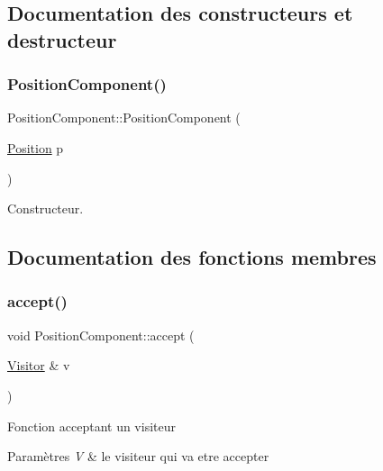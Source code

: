 \subsection{Documentation des constructeurs et destructeur}
\mbox{\label{structPositionComponent_af8c7fde08522e4ad2c911a9759ce1808}} 
\subsubsection{\texorpdfstring{Position\+Component()}{PositionComponent()}}
{\footnotesize\ttfamily Position\+Component\+::\+Position\+Component (\begin{DoxyParamCaption}\item[{\hyperlink{structPosition}{Position}}]{p }\end{DoxyParamCaption})\hspace{0.3cm}{\ttfamily [inline]}}



Constructeur. 



\subsection{Documentation des fonctions membres}
\mbox{\label{structPositionComponent_a7f5ef56cf9e5722c7df9fdfa66fdf425}} 
\subsubsection{\texorpdfstring{accept()}{accept()}}
{\footnotesize\ttfamily void Position\+Component\+::accept (\begin{DoxyParamCaption}\item[{\hyperlink{classVisitor}{Visitor} \&}]{v }\end{DoxyParamCaption})\hspace{0.3cm}{\ttfamily [virtual]}}

Fonction acceptant un visiteur


\begin{DoxyParams}{Paramètres}
{\em V} & le visiteur qui va etre accepter \\
\hline
\end{DoxyParams}



